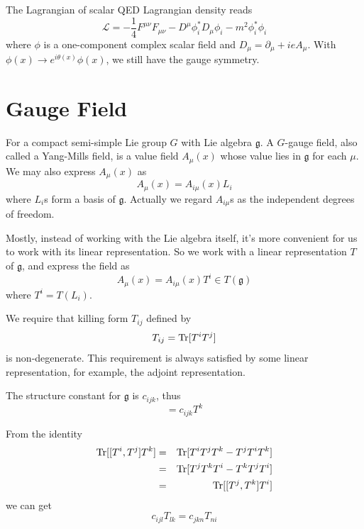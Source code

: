 \documentclass[12pt]{book}
\begin{document}
	
	The Lagrangian of  scalar QED Lagrangian density reads
		\begin{equation}
		\mathcal L=-\frac 14F^{\mu\nu}F_{\mu\nu}-D^\mu\phi_i^*D_\mu\phi_i-m^2\phi_i^*\phi_i
		\end{equation}
		where $\phi$ is a one-component complex scalar field and $D_\mu=\partial_\mu+ieA_\mu$. With $\phi(x)\rightarrow e^{i\theta(x)}\phi(x)$, we still have the gauge symmetry.
	
	\section{Gauge Field}
	For a compact semi-simple Lie group $G$ with Lie algebra $\mathfrak g$. A $G$-gauge field, also called a Yang-Mills field, is a value field $A_\mu(x)$ whose value lies in $\mathfrak g$ for each $\mu$. We may also express $A_\mu(x)$ as 
	\begin{equation}
	A_\mu(x) = A_{i\mu}(x)L_i
	\end{equation}
	where $L_i$s form a basis of $\mathfrak g$. Actually we regard $A_{i\mu}$s as the independent degrees of freedom.
	
	Mostly, instead of working with the Lie algebra itself, it's more convenient for us to work with its linear representation. So we work with a linear representation $T$ of $\mathfrak g$, and express the field as
	\begin{equation}
		A_\mu(x) = A_{i\mu}(x)T^i \in T(\mathfrak g)
	\end{equation}
	where $T^i=T(L_i)$.
	
	We require that killing form $T_{ij}$ defined by
	\begin{equation}
		T_{ij}={\rm Tr}[T^iT^j]
	\end{equation}
	is non-degenerate. This requirement is always satisfied by some linear representation, for example, the adjoint representation.
		
	The structure constant for $\mathfrak g$ is $c_{ijk}$, thus
	\begin{equation}
		[T^i,T^j]=c_{ijk}T^k
	\end{equation}
	
	From the identity
	\begin{eqnarray}
		{\rm Tr}[[T^i,T^j]T^k]&=&{\rm Tr}[T^iT^jT^k-T^jT^iT^k]\\
		&=&{\rm Tr}[T^jT^kT^i-T^kT^jT^i]\\
		&=&{\rm Tr}[[T^j,T^k]T^i]
	\end{eqnarray}
	we can get
	\begin{equation}
		c_{ijl}T_{lk}=c_{jkn}T_{ni}
	\end{equation}
		
\end{document}
